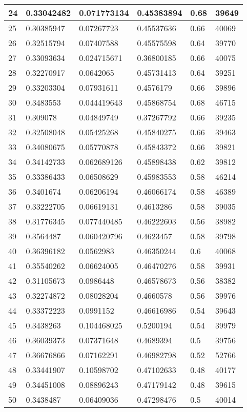 \begin{longtable}{|l|l|l|l|l|l|}
24 & 0.33042482 & 0.071773134 & 0.45383894 & 0.68 & 39649 \\ \hline 
25 & 0.30385947 & 0.07267723 & 0.45537636 & 0.66 & 40069 \\ \hline 
26 & 0.32515794 & 0.07407588 & 0.45575598 & 0.64 & 39770 \\ \hline 
27 & 0.33093634 & 0.024715671 & 0.36800185 & 0.66 & 40075 \\ \hline 
28 & 0.32270917 & 0.0642065 & 0.45731413 & 0.64 & 39251 \\ \hline 
29 & 0.33203304 & 0.07931611 & 0.4576179 & 0.66 & 39896 \\ \hline 
30 & 0.3483553 & 0.044419643 & 0.45868754 & 0.68 & 46715 \\ \hline 
31 & 0.309078 & 0.04849749 & 0.37267792 & 0.66 & 39235 \\ \hline 
32 & 0.32508048 & 0.05425268 & 0.45840275 & 0.66 & 39463 \\ \hline 
33 & 0.34080675 & 0.05770878 & 0.45843372 & 0.66 & 39821 \\ \hline 
34 & 0.34142733 & 0.062689126 & 0.45898438 & 0.62 & 39812 \\ \hline 
35 & 0.33386433 & 0.06508629 & 0.45983553 & 0.58 & 46214 \\ \hline 
36 & 0.3401674 & 0.06206194 & 0.46066174 & 0.58 & 46389 \\ \hline 
37 & 0.33222705 & 0.06619131 & 0.4613286 & 0.58 & 39035 \\ \hline 
38 & 0.31776345 & 0.077440485 & 0.46222603 & 0.56 & 38982 \\ \hline 
39 & 0.3564487 & 0.060420796 & 0.4623457 & 0.58 & 39798 \\ \hline 
40 & 0.36396182 & 0.0562983 & 0.46350244 & 0.6 & 40068 \\ \hline 
41 & 0.35540262 & 0.06624005 & 0.46470276 & 0.58 & 39931 \\ \hline 
42 & 0.31105673 & 0.0986448 & 0.46578673 & 0.56 & 38382 \\ \hline 
43 & 0.32274872 & 0.08028204 & 0.4660578 & 0.56 & 39976 \\ \hline 
44 & 0.33372223 & 0.0991152 & 0.46616986 & 0.54 & 39643 \\ \hline 
45 & 0.3438263 & 0.104468025 & 0.5200194 & 0.54 & 39979 \\ \hline 
46 & 0.36039373 & 0.07371648 & 0.4689394 & 0.5 & 39756 \\ \hline 
47 & 0.36676866 & 0.07162291 & 0.46982798 & 0.52 & 52766 \\ \hline 
48 & 0.33441907 & 0.10598702 & 0.47102633 & 0.48 & 40177 \\ \hline 
49 & 0.34451008 & 0.08896243 & 0.47179142 & 0.48 & 39615 \\ \hline 
50 & 0.3438487 & 0.06409036 & 0.47298476 & 0.5 & 40014 \\ \hline 
\end{longtable}